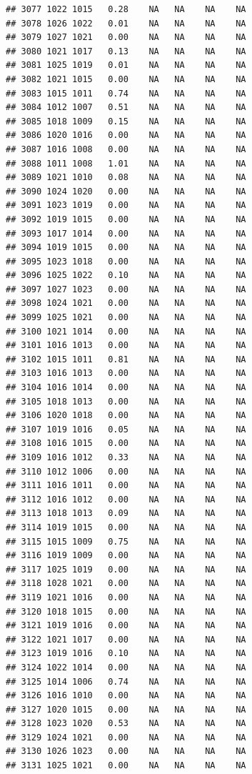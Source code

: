 \documentclass{article}\usepackage{graphicx, color}
\makeatletter
\newenvironment{kframe}{%
 \def\at@end@of@kframe{}%
 \ifinner\ifhmode%
  \def\at@end@of@kframe{\end{minipage}}%
  \begin{minipage}{\columnwidth}%
 \fi\fi%
 \def\FrameCommand##1{\hskip\@totalleftmargin \hskip-\fboxsep
 \colorbox{shadecolor}{##1}\hskip-\fboxsep
     \hskip-\linewidth \hskip-\@totalleftmargin \hskip\columnwidth}%
 \MakeFramed {\advance\hsize-\width
   \@totalleftmargin\z@ \linewidth\hsize
   \@setminipage}}%
 {\par\unskip\endMakeFramed%
 \at@end@of@kframe}
\newenvironment{knitrout}{}{} %
\makeatother
\begin{document}
\begin{knitrout}
\begin{kframe}
\begin{verbatim}
## 3077 1022 1015   0.28    NA   NA    NA    NA
## 3078 1026 1022   0.01    NA   NA    NA    NA
## 3079 1027 1021   0.00    NA   NA    NA    NA
## 3080 1021 1017   0.13    NA   NA    NA    NA
## 3081 1025 1019   0.01    NA   NA    NA    NA
## 3082 1021 1015   0.00    NA   NA    NA    NA
## 3083 1015 1011   0.74    NA   NA    NA    NA
## 3084 1012 1007   0.51    NA   NA    NA    NA
## 3085 1018 1009   0.15    NA   NA    NA    NA
## 3086 1020 1016   0.00    NA   NA    NA    NA
## 3087 1016 1008   0.00    NA   NA    NA    NA
## 3088 1011 1008   1.01    NA   NA    NA    NA
## 3089 1021 1010   0.08    NA   NA    NA    NA
## 3090 1024 1020   0.00    NA   NA    NA    NA
## 3091 1023 1019   0.00    NA   NA    NA    NA
## 3092 1019 1015   0.00    NA   NA    NA    NA
## 3093 1017 1014   0.00    NA   NA    NA    NA
## 3094 1019 1015   0.00    NA   NA    NA    NA
## 3095 1023 1018   0.00    NA   NA    NA    NA
## 3096 1025 1022   0.10    NA   NA    NA    NA
## 3097 1027 1023   0.00    NA   NA    NA    NA
## 3098 1024 1021   0.00    NA   NA    NA    NA
## 3099 1025 1021   0.00    NA   NA    NA    NA
## 3100 1021 1014   0.00    NA   NA    NA    NA
## 3101 1016 1013   0.00    NA   NA    NA    NA
## 3102 1015 1011   0.81    NA   NA    NA    NA
## 3103 1016 1013   0.00    NA   NA    NA    NA
## 3104 1016 1014   0.00    NA   NA    NA    NA
## 3105 1018 1013   0.00    NA   NA    NA    NA
## 3106 1020 1018   0.00    NA   NA    NA    NA
## 3107 1019 1016   0.05    NA   NA    NA    NA
## 3108 1016 1015   0.00    NA   NA    NA    NA
## 3109 1016 1012   0.33    NA   NA    NA    NA
## 3110 1012 1006   0.00    NA   NA    NA    NA
## 3111 1016 1011   0.00    NA   NA    NA    NA
## 3112 1016 1012   0.00    NA   NA    NA    NA
## 3113 1018 1013   0.09    NA   NA    NA    NA
## 3114 1019 1015   0.00    NA   NA    NA    NA
## 3115 1015 1009   0.75    NA   NA    NA    NA
## 3116 1019 1009   0.00    NA   NA    NA    NA
## 3117 1025 1019   0.00    NA   NA    NA    NA
## 3118 1028 1021   0.00    NA   NA    NA    NA
## 3119 1021 1016   0.00    NA   NA    NA    NA
## 3120 1018 1015   0.00    NA   NA    NA    NA
## 3121 1019 1016   0.00    NA   NA    NA    NA
## 3122 1021 1017   0.00    NA   NA    NA    NA
## 3123 1019 1016   0.10    NA   NA    NA    NA
## 3124 1022 1014   0.00    NA   NA    NA    NA
## 3125 1014 1006   0.74    NA   NA    NA    NA
## 3126 1016 1010   0.00    NA   NA    NA    NA
## 3127 1020 1015   0.00    NA   NA    NA    NA
## 3128 1023 1020   0.53    NA   NA    NA    NA
## 3129 1024 1021   0.00    NA   NA    NA    NA
## 3130 1026 1023   0.00    NA   NA    NA    NA
## 3131 1025 1021   0.00    NA   NA    NA    NA

\end{verbatim}
\end{kframe}
\end{knitrout}
\end{document}
